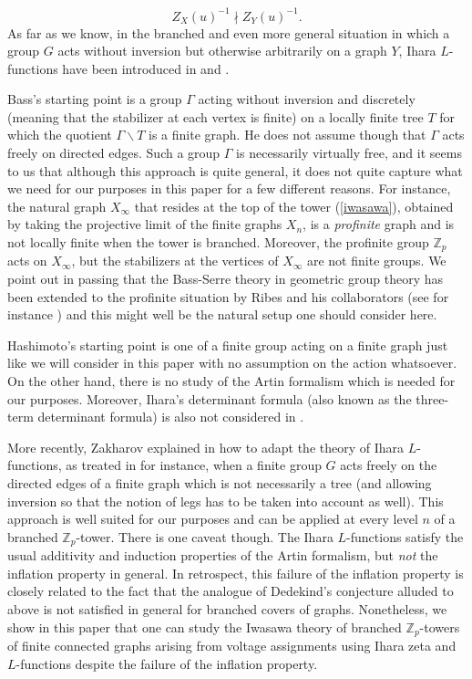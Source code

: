 \documentclass[11pt]{amsart}
\numberwithin{equation}{section}
\theoremstyle{remark}
\theoremstyle{definition}
\begin{document}
$$Z_{X}(u)^{-1}  \nmid Z_{Y}(u)^{-1}.$$
As far as we know, in the branched and even more general situation in which a group $G$ acts without inversion but otherwise arbitrarily on a graph $Y$, Ihara $L$-functions have been introduced in \cite{Bass:1992} and \cite{Hashimoto:1992}.  

Bass's starting point is a group $\Gamma$ acting without inversion and discretely (meaning that the stabilizer at each vertex is finite) on a locally finite tree $T$ for which the quotient $\Gamma \backslash T$ is a finite graph.  He does not assume though that $\Gamma$ acts freely on directed edges.  Such a group $\Gamma$ is necessarily virtually free, and it seems to us that although this approach is quite general, it does not quite capture what we need for our purposes in this paper for a few different reasons.  For instance, the natural graph $X_{\infty}$ that resides at the top of the tower (\ref{iwasawa}), obtained by taking the projective limit of the finite graphs $X_{n}$, is a \emph{profinite} graph and is not locally finite when the tower is branched.  Moreover, the profinite group $\mathbb{Z}_{p}$ acts on $X_{\infty}$, but the stabilizers at the vertices of $X_{\infty}$ are not finite groups.  We point out in passing that the Bass-Serre theory in geometric group theory has been extended to the profinite situation by Ribes and his collaborators (see for instance \cite{Ribes:2017}) and this might well be the natural setup one should consider here. 

Hashimoto's starting point is one of a finite group acting on a finite graph just like we will consider in this paper with no assumption on the action whatsoever.  On the other hand, there is no study of the Artin formalism which is needed for our purposes.  Moreover, Ihara's determinant formula (also known as the three-term determinant formula) is also not considered in \cite{Hashimoto:1992}.

More recently, Zakharov explained in \cite{Zakharov:2021} how to adapt the theory of Ihara $L$-functions, as treated in \cite{Terras:2011} for instance, when a finite group $G$ acts freely on the directed edges of a finite graph which is not necessarily a tree (and allowing inversion so that the notion of legs has to be taken into account as well).  This approach is well suited for our purposes and can be applied at every level $n$ of a branched $\mathbb{Z}_{p}$-tower.  There is one caveat though.  The Ihara $L$-functions satisfy the usual additivity and induction properties of the Artin formalism, but \emph{not} the inflation property in general.  In retrospect, this failure of the inflation property is closely related to the fact that the analogue of Dedekind's conjecture alluded to above is not satisfied in general for branched covers of graphs.  Nonetheless, we show in this paper that one can study the Iwasawa theory of branched $\mathbb{Z}_{p}$-towers of finite connected graphs arising from voltage assignments using Ihara zeta and $L$-functions despite the failure of the inflation property. 
\end{document}
